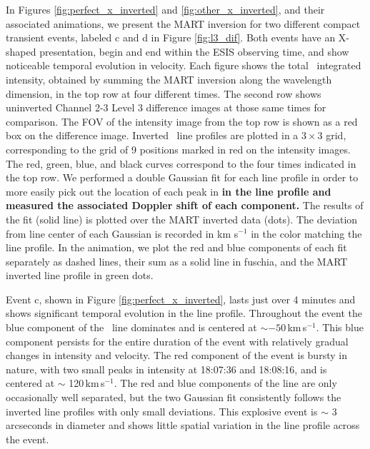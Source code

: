 \documentclass[linenumbers,trackchanges]{aastex63}
\begin{document}
In Figures \ref{fig:perfect_x_inverted} and \ref{fig:other_x_inverted}, and their associated animations, we present the MART inversion for two different compact transient events, labeled c and d in Figure \ref{fig:l3_dif}.
    	Both events have an X-shaped presentation, begin and end within the ESIS observing time, and show noticeable temporal evolution in velocity.
		Each figure shows the total \ov \ integrated intensity, obtained by summing the MART inversion along the wavelength dimension, in the top row  at four different times. 
		The second row shows uninverted Channel 2-3 Level 3 difference images at those same times for comparison.
		The FOV of the intensity image from the top row is shown as a red box on the difference image.
		Inverted \ov\ line profiles are plotted in a $3\times 3$ grid, corresponding to the grid of 9 positions marked in red on the intensity images. The red, green, blue, and black curves correspond to the four times indicated in the top row.
		We performed a double Gaussian fit for each line profile in order to more easily pick out the location of each peak in \textbf{in the line profile and measured the associated Doppler shift of each component.}
		The results of the fit (solid line) is plotted over the MART inverted data (dots).
		The deviation from line center of each Gaussian is recorded in km s$^{-1}$ in the color matching the line profile.
		In the animation, we plot the red and blue components of each fit separately as dashed lines, their sum as a solid line in fuschia, and the MART inverted line profile in  green dots.
		

		
		Event c, shown in Figure \ref{fig:perfect_x_inverted}, lasts just over 4 minutes and shows significant temporal evolution in the line profile.
		Throughout the event the blue component of the \ov \ line dominates and is centered at $\sim -50$\,km\,s$^{-1}$.
		This blue component persists for the entire duration of the event with relatively gradual changes in intensity and velocity.
		The red component of the event is bursty in nature, with two small peaks in intensity at 18:07:36 and 18:08:16, and is centered at $\sim$ 120\,km\,s$^{-1}$. 
	    The red and blue components of the line are only occasionally well separated, but the two Gaussian fit consistently follows the inverted line profiles with only small deviations.
		This explosive event is $\sim$ 3 arcseconds in diameter and shows little spatial variation in the line profile across the event.
		
\end{document}
